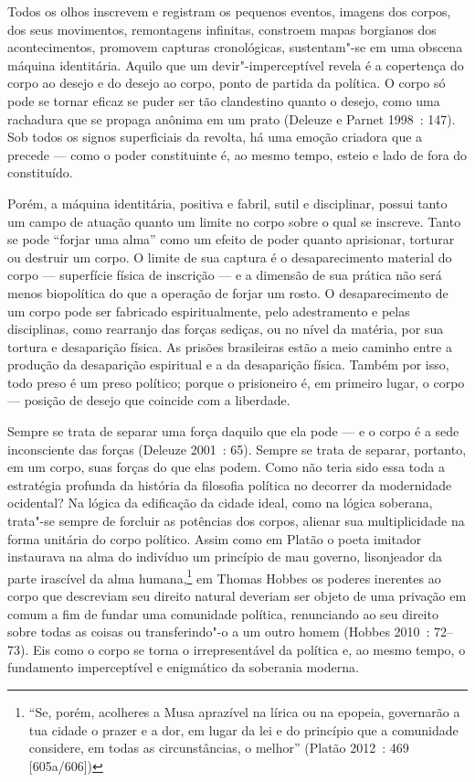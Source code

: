 Todos os olhos inscrevem e
registram os pequenos eventos, imagens dos corpos, dos seus movimentos,
remontagens infinitas, constroem mapas borgianos dos acontecimentos,
promovem capturas cronológicas, sustentam"-se em uma obscena máquina
identitária. Aquilo que um devir"-imperceptível revela é a copertença do
corpo ao desejo e do desejo ao corpo, ponto de partida da política. O
corpo só pode se tornar eficaz se puder ser tão clandestino quanto o
desejo, como uma rachadura que se propaga anônima em um prato (Deleuze e
Parnet 1998~: 147). Sob todos os signos superficiais da revolta, há uma
emoção criadora que a precede --- como o poder constituinte é, ao mesmo
tempo, esteio e lado de fora do constituído.

Porém, a máquina identitária, positiva e fabril, sutil e disciplinar,
possui tanto um campo de atuação quanto um limite no corpo sobre o qual
se inscreve. Tanto se pode ``forjar uma alma'' como um efeito de poder
quanto aprisionar, torturar ou destruir um corpo. O limite de sua
captura é o desaparecimento material do corpo --- superfície física de
inscrição --- e a dimensão de sua prática não será menos biopolítica do
que a operação de forjar um rosto. O desaparecimento de um corpo pode
ser fabricado espiritualmente, pelo adestramento e pelas disciplinas,
como rearranjo das forças sediças, ou no nível da matéria, por sua
tortura e desaparição física. As prisões brasileiras estão a meio
caminho entre a produção da desaparição espiritual e a da desaparição
física. Também por isso, todo preso é um preso político; porque o
prisioneiro é, em primeiro lugar, o corpo --- posição de desejo que
coincide com a liberdade.

Sempre se trata de separar uma força daquilo que ela pode --- e o corpo é
a sede inconsciente das forças (Deleuze 2001~: 65). Sempre se trata de
separar, portanto, em um corpo, suas forças do que elas podem. Como não
teria sido essa toda a estratégia profunda da história da filosofia
política no decorrer da modernidade ocidental? Na lógica da edificação
da cidade ideal, como na lógica soberana, trata"-se sempre de forcluir as
potências dos corpos, alienar sua multiplicidade na forma unitária do
corpo político. Assim como em Platão o poeta imitador instaurava na alma
do indivíduo um princípio de mau governo, lisonjeador da parte irascível
da alma humana,\footnote{``Se, porém, acolheres a Musa
  aprazível na lírica ou na epopeia, governarão a tua cidade o prazer e
  a dor, em lugar da lei e do princípio que a comunidade considere, em
  todas as circunstâncias, o melhor'' (Platão 2012~: 469 {[}605a/606{]})}
em Thomas Hobbes os poderes inerentes ao corpo que descreviam seu
direito natural deveriam ser objeto de uma privação em comum a fim de
fundar uma comunidade política, renunciando ao seu direito sobre todas
as coisas ou transferindo"-o a um outro homem (Hobbes 2010~: 72--73). Eis
como o corpo se torna o irrepresentável da política e, ao mesmo tempo, o
fundamento imperceptível e enigmático da soberania moderna.

